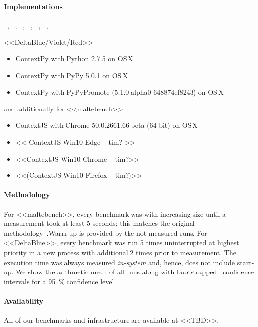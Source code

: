 \documentclass[preprint,english,10pt,nonatbib]{sigplanconf}
\begin{document}
\paragraph{Implementations} %
~, %
~, %
~, %
~, %
~, %
~, %

<<DeltaBlue/Violet/Red>>
\begin{itemize}
\item ContextPy with Python 2.7.5 on OS\,X
\item ContextPy with PyPy 5.0.1 on OS\,X
\item ContextPy with PyPyPromote (5.1.0-alpha0 648874ef8243) on OS\,X
\end{itemize}

and additionally for <<maltebench>>
\begin{itemize}
\item ContextJS with Chrome 50.0.2661.66 beta (64-bit) on OS\,X
\item << ContextJS Win10 Edge -- tim? >>
\item <<ContextJS Win10 Chrome -- tim?>>
\item <<(ContextJS Win10 Firefox -- tim?)>>
\end{itemize}

\paragraph{Methodology} 
For <<maltebench>>, every benchmark was with increasing size until a
measurement took at least 5 seconds; this matches the original
methodology~\cite{appeltauer+:2009:comparison-context-oriented}.Warm-up is
provided by the not measured runs.
For <<DeltaBlue>>, every benchmark was run 5 times uninterrupted at highest
priority in a new process with additional 2 times prior to measurement.
The execution time was always measured \emph{in-system} and, hence, does not include start-up.
We show the arithmetic mean of all  runs along with
bootstrapped~\cite{davison+:1997:confidence-intervals} confidence intervals
for a \SI{95}{\percent} confidence level.


\paragraph{Availability}  All of our benchmarks and infrastructure
 are available at <<TBD>>.
\end{document}
